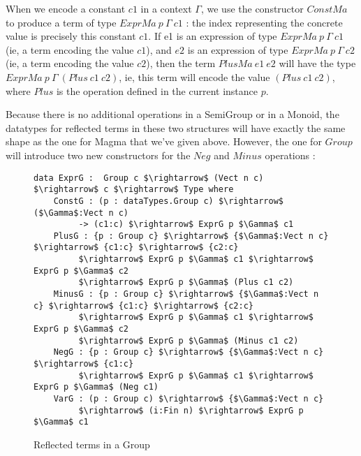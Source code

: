 When we encode a constant $c1$ in a context $\Gamma$, we use the constructor $ConstMa$ to produce a term of type $ExprMa\ p\ \Gamma\ c1$ : the index representing the concrete value is precisely this constant $c1$.
If e1 is an expression of type $ExprMa\ p\ \Gamma\ c1$ (ie, a term encoding the value $c1$), and $e2$ is an expression of type $ExprMa\ p\ \Gamma\ c2$ (ie, a term encoding the value $c2$), then the term $PlusMa\ e1\ e2$ will have the type $ExprMa\ p\ \Gamma\ (Plus\ c1\ c2)$, ie, this term will encode the value $(Plus\ c1\ c2)$, where $Plus$ is the operation defined in the current instance $p$.


%
%
Because there is no additional operations in a SemiGroup or in a Monoid, the datatypes for reflected terms in these two structures will have exactly the same shape as the one for Magma that we've given above.
However, the one for $Group$ will introduce two new constructors for the $Neg$ and $Minus$ operations :


\begin{figure}[H]
\figrule
\begin{center}
\begin{lstlisting}
data ExprG :  Group c $\rightarrow$ (Vect n c) $\rightarrow$ c $\rightarrow$ Type where
    ConstG : (p : dataTypes.Group c) $\rightarrow$ ($\Gamma$:Vect n c) 
         -> (c1:c) $\rightarrow$ ExprG p $\Gamma$ c1
    PlusG : {p : Group c} $\rightarrow$ {$\Gamma$:Vect n c} $\rightarrow$ {c1:c} $\rightarrow$ {c2:c} 
         $\rightarrow$ ExprG p $\Gamma$ c1 $\rightarrow$ ExprG p $\Gamma$ c2 
         $\rightarrow$ ExprG p $\Gamma$ (Plus c1 c2)
    MinusG : {p : Group c} $\rightarrow$ {$\Gamma$:Vect n c} $\rightarrow$ {c1:c} $\rightarrow$ {c2:c} 
         $\rightarrow$ ExprG p $\Gamma$ c1 $\rightarrow$ ExprG p $\Gamma$ c2 
         $\rightarrow$ ExprG p $\Gamma$ (Minus c1 c2)
    NegG : {p : Group c} $\rightarrow$ {$\Gamma$:Vect n c} $\rightarrow$ {c1:c} 
         $\rightarrow$ ExprG p $\Gamma$ c1 $\rightarrow$ ExprG p $\Gamma$ (Neg c1)
    VarG : (p : Group c) $\rightarrow$ {$\Gamma$:Vect n c} 
         $\rightarrow$ (i:Fin n) $\rightarrow$ ExprG p $\Gamma$ c1
\end{lstlisting}
\end{center}
\caption{Reflected terms in a Group}
\figrule
\end{figure}

